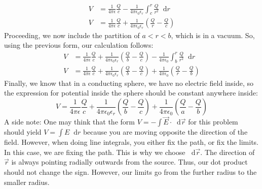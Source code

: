 \documentclass{article}
\newcommand*\dif{\mathop{}\!\mathrm{d}}
\begin{document}
\begin{align*}
V &= \frac{1}{4\pi\epsilon}\frac{Q}{c} - \frac{1}{4\pi\epsilon_0\epsilon_r} \int_c^r \frac{Q}{r^2} \dif r\\
V &= \frac{1}{4\pi\epsilon}\frac{Q}{c} + \frac{1}{4\pi\epsilon_0\epsilon_r}\left(\frac{Q}{r}-\frac{Q}{c}\right)
\end{align*} 
Proceeding, we now include the partition of $a < r < b$, which is in a vacuum. So, using the previous form, our calculation follows:
\begin{align*}
V &= \frac{1}{4\pi\epsilon}\frac{Q}{c} + \frac{1}{4\pi\epsilon_0\epsilon_r}\left(\frac{Q}{b}-\frac{Q}{c}\right) - \frac{1}{4\pi\epsilon_0}\int_b^r \frac{Q}{r^2}\dif r\\
V &= \frac{1}{4\pi\epsilon}\frac{Q}{c} + \frac{1}{4\pi\epsilon_0\epsilon_r}\left(\frac{Q}{b}-\frac{Q}{c}\right) + \frac{1}{4\pi\epsilon_0}\left(\frac{Q}{r}-\frac{Q}{b}\right)
\end{align*}
Finally, we know that in a conducting sphere, we have no electric field inside, so the expression for potential inside the sphere should be constant anywhere inside:
$$V = \frac{1}{4\pi\epsilon}\frac{Q}{c} + \frac{1}{4\pi\epsilon_0\epsilon_r}\left(\frac{Q}{b}-\frac{Q}{c}\right) + \frac{1}{4\pi\epsilon_0}\left(\frac{Q}{a}-\frac{Q}{b}\right)$$
A side note: One may think that the form $V = -\int \vec{E} \cdot \dif \vec{r}$ for this problem should yield $V = \int E \dif r$ because you are moving opposite the direction of the field. However, when doing line integrals, you either fix the path, or fix the limits. In this case, we are fixing the path. This is why we choose $\dif \vec{r}$. The direction of $\vec{r}$ is always pointing radially outwards from the source. Thus, our dot product should not change the sign. However, our limits go from the further radius to the smaller radius. \\
\\
\end{document}
